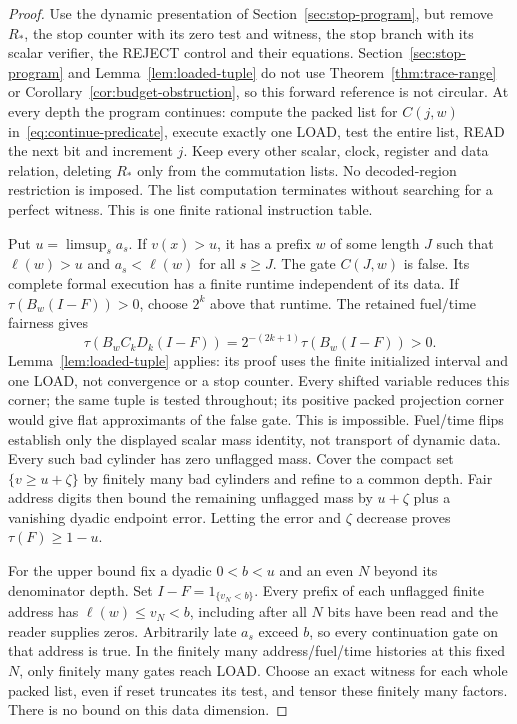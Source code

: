 \begin{proof}
Use the dynamic presentation of Section~\ref{sec:stop-program}, but remove $R_*$, the stop counter with its zero test and witness, the stop branch with its scalar verifier, the REJECT control and their equations. Section~\ref{sec:stop-program} and Lemma~\ref{lem:loaded-tuple} do not use Theorem~\ref{thm:trace-range} or Corollary~\ref{cor:budget-obstruction}, so this forward reference is not circular. At every depth the program continues: compute the packed list for $C(j,w)$ in~\eqref{eq:continue-predicate}, execute exactly one LOAD, test the entire list, READ the next bit and increment $j$. Keep every other scalar, clock, register and data relation, deleting $R_*$ only from the commutation lists. No decoded-region restriction is imposed. The list computation terminates without searching for a perfect witness. This is one finite rational instruction table.

Put $u=\limsup_s a_s$. If $v(x)>u$, it has a prefix $w$ of some length $J$ such that $\ell(w)>u$ and $a_s<\ell(w)$ for all $s\ge J$. The gate $C(J,w)$ is false. Its complete formal execution has a finite runtime independent of its data. If $\tau(B_w(I-F))>0$, choose $2^k$ above that runtime. The retained fuel/time fairness gives
\[
 \tau(B_wC_kD_k(I-F))=2^{-(2k+1)}\tau(B_w(I-F))>0.
\]
Lemma~\ref{lem:loaded-tuple} applies: its proof uses the finite initialized interval and one LOAD, not convergence or a stop counter. Every shifted variable reduces this corner; the same tuple is tested throughout; its positive packed projection corner would give flat approximants of the false gate. This is impossible. Fuel/time flips establish only the displayed scalar mass identity, not transport of dynamic data. Every such bad cylinder has zero unflagged mass. Cover the compact set $\{v\ge u+\zeta\}$ by finitely many bad cylinders and refine to a common depth. Fair address digits then bound the remaining unflagged mass by $u+\zeta$ plus a vanishing dyadic endpoint error. Letting the error and $\zeta$ decrease proves $\tau(F)\ge1-u$.

For the upper bound fix a dyadic $0<b<u$ and an even $N$ beyond its denominator depth. Set $I-F=1_{\{v_N<b\}}$. Every prefix of each unflagged finite address has $\ell(w)\le v_N<b$, including after all $N$ bits have been read and the reader supplies zeros. Arbitrarily late $a_s$ exceed $b$, so every continuation gate on that address is true. In the finitely many address/fuel/time histories at this fixed $N$, only finitely many gates reach LOAD. Choose an exact witness for each whole packed list, even if reset truncates its test, and tensor these finitely many factors. There is no bound on this data dimension.


\end{proof}
